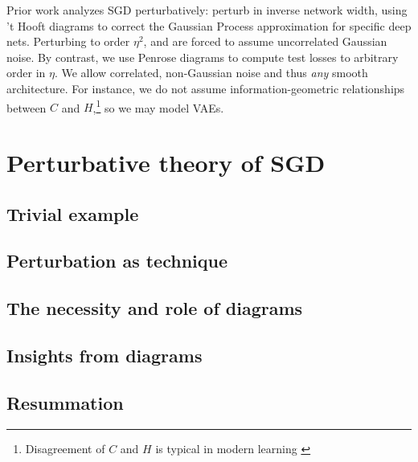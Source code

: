 \documentclass[final,12pt]{colt2021} %
\begin{document}
        
            Prior work analyzes SGD perturbatively: \cite{dy19} perturb in
            inverse network width, using 't Hooft diagrams to correct the
            Gaussian Process approximation for specific deep nets.  Perturbing
            to order $\eta^2$, \cite{ch18} and \cite{li17} are forced to assume
            uncorrelated Gaussian noise.  By contrast, we use Penrose diagrams
            to compute test losses to arbitrary order in $\eta$.  We allow
            correlated, non-Gaussian noise and thus \emph{any} smooth
            architecture.  For instance, we do not assume information-geometric
            relationships between $C$ and $H$,\footnote{
                Disagreement of $C$ and
                $H$ is typical in modern learning \citep{ro12, ku19}
            } so we may model VAEs. 

    \section{Perturbative theory of SGD}
        \subsection{Trivial example}
        \subsection{Perturbation as technique}
        \subsection{The necessity and role of diagrams}\label{ssect:what-are-diagrams}
        \subsection{Insights from diagrams}
        \subsection{Resummation}

\end{document}
